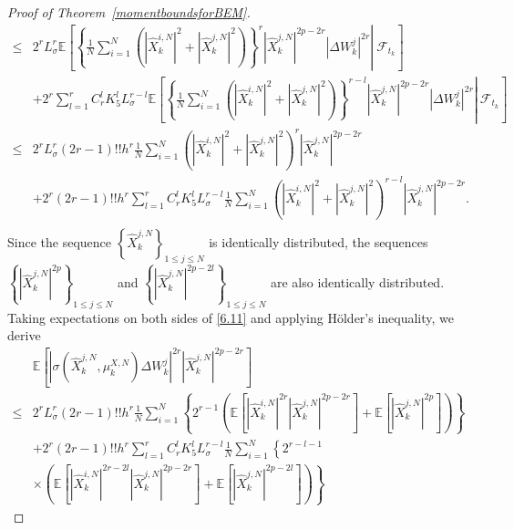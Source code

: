 \documentclass[12pt]{article}
\numberwithin{equation}{section}
\begin{document}
\begin{proof}[Proof of Theorem~\ref{momentboundsforBEM}]
\begin{equation}
\begin{aligned}
\le& 2^rL_{\sigma}^{r}\mathbb{E} \left[\left. \left\{ \tfrac{1}{N}\sum_{i=1}^N{\left( \left|\hat{X}_{k}^{i,N}\right|^2+\left|\hat{X}_{k}^{j,N}\right|^2 \right)} \right\} ^r\left| \hat{X}_{k}^{j,N} \right|^{2p-2r}\left| \Delta W_{k}^{j} \right|^{2r}\right\rvert\ \mathcal{F} _{t_k} \right]\\
&+2^r\sum_{l=1}^r{C_{r}^{l}K_{5}^{l}L_{\sigma}^{r-l}\mathbb{E} \left[\left. \left\{ \tfrac{1}{N}\sum_{i=1}^N{\left( \left|\hat{X}_{k}^{i,N}\right|^2+\left|\hat{X}_{k}^{j,N}\right|^2 \right)} \right\} ^{r-l}\left| \hat{X}_{k}^{j,N} \right|^{2p-2r}\left| \Delta W_{k}^{j} \right|^{2r}\right\rvert\ \mathcal{F} _{t_k} \right]}\\
\le& 2^rL_{\sigma}^{r}\left( 2r-1 \right) !!h^r\tfrac{1}{N}\sum_{i=1}^N{\left( \left|\hat{X}_{k}^{i,N}\right|^2+\left|\hat{X}_{k}^{j,N}\right|^2 \right) ^r\left| \hat{X}_{k}^{j,N} \right|^{2p-2r}}\\
&+2^r\left( 2r-1 \right) !!h^r\sum_{l=1}^r{C_{r}^{l}K_{5}^{l}L_{\sigma}^{r-l}\tfrac{1}{N}\sum_{i=1}^N{\left( \left|\hat{X}_{k}^{i,N}\right|^2+\left|\hat{X}_{k}^{j,N}\right|^2 \right) ^{r-l}\left| \hat{X}_{k}^{j,N} \right|^{2p-2r}}}.\\
\end{aligned}
\end{equation}
Since the sequence $\left\{ \hat{X}_k^{j,N} \right\}_{1 \leq j \leq N}$ is identically distributed, the sequences $\left\{ \left|\hat{X}_k^{j,N}\right|^{2p} \right\}_{1 \leq j \leq N}$ and $\left\{ \left|\hat{X}_k^{j,N}\right|^{2p - 2l} \right\}_{1 \leq j \leq N}$ are also identically distributed. Taking expectations on both sides of \eqref{6.11} and applying H\"older's inequality, we derive
\begin{equation}\tag{5.116}\label{6.13}
\begin{aligned}
&\mathbb{E} \left[ \left| \sigma \left( \hat{X}_{k}^{j,N},\mu _{k}^{X,N} \right) \Delta W_{k}^{j} \right|^{2r}\left| \hat{X}_{k}^{j,N} \right|^{2p-2r} \right] 
\\
\le& 2^rL_{\sigma}^{r}\left( 2r-1 \right) !!h^r\tfrac{1}{N}\sum_{i=1}^N{\left\{ 2^{r-1}\left( \mathbb{E} \left[ \left| \hat{X}_{k}^{i,N} \right|^{2r}\left| \hat{X}_{k}^{j,N} \right|^{2p-2r} \right] +\mathbb{E} \left[ \left| \hat{X}_{k}^{j,N} \right|^{2p} \right] \right) \right\}}
\\
&+2^r\left( 2r-1 \right) !!h^r\sum_{l=1}^r{C_{r}^{l}K_{5}^{l}L_{\sigma}^{r-l}\tfrac{1}{N}\sum_{i=1}^N{\left\{ 2^{r-l-1} \right.}}
\\
 &\times\left. \left( \mathbb{E} \left[ \left| \hat{X}_{k}^{i,N} \right|^{2r-2l}\left| \hat{X}_{k}^{j,N} \right|^{2p-2r} \right] +\mathbb{E} \left[ \left| \hat{X}_{k}^{j,N} \right|^{2p-2l} \right] \right) \right\} 

\end{aligned}
\end{equation}
\end{proof}
\end{document}
